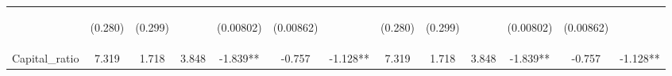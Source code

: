 \documentclass[]{article}
\begin{document}
\begin{center}
\begin{tabular}{lcccccccccccc}
\vspace{4pt} & \begin{footnotesize}(0.280)\end{footnotesize} & \begin{footnotesize}(0.299)\end{footnotesize} & \begin{footnotesize}\end{footnotesize} & \begin{footnotesize}(0.00802)\end{footnotesize} & \begin{footnotesize}(0.00862)\end{footnotesize} & \begin{footnotesize}\end{footnotesize} & \begin{footnotesize}(0.280)\end{footnotesize} & \begin{footnotesize}(0.299)\end{footnotesize} & \begin{footnotesize}\end{footnotesize} & \begin{footnotesize}(0.00802)\end{footnotesize} & \begin{footnotesize}(0.00862)\end{footnotesize} & \begin{footnotesize}\end{footnotesize} \\
Capital\_ratio & 7.319 & 1.718 & 3.848 & -1.839** & -0.757 & -1.128** & 7.319 & 1.718 & 3.848 & -1.839** & -0.757 & -1.128** \\

\end{tabular}
\end{center}
\end{document}
